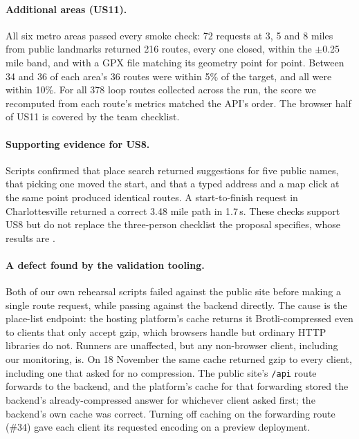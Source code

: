 \paragraph{Additional areas (US11).}
All six metro areas passed every smoke check: 72 requests at 3, 5 and 8 miles
from public landmarks returned 216 routes, every one closed, within the
$\pm$0.25 mile band, and with a GPX file matching its geometry point for
point. Between 34 and 36 of each area's 36 routes were within 5\% of the
target, and all were within 10\%. For all 378 loop routes collected across
the run, the score we recomputed from each route's metrics matched the API's
order. The browser half of US11 is covered by the team checklist.

\paragraph{Supporting evidence for US8.}
Scripts confirmed that place search returned suggestions for five public
names, that picking one moved the start, and that a typed address and a map
click at the same point produced identical routes. A start-to-finish request
in Charlottesville returned a correct 3.48 mile path in 1.7\,s. These checks
support US8 but do not replace the three-person checklist the proposal
specifies, whose results are .

\paragraph{A defect found by the validation tooling.}
Both of our own rehearsal scripts failed against the public site before
making a single route request, while passing against the backend directly.
The cause is the place-list endpoint: the hosting platform's cache returns
it Brotli-compressed even to clients that only accept gzip, which browsers
handle but ordinary HTTP libraries do not. Runners are unaffected, but any
non-browser client, including our monitoring, is. On 18 November the same
cache returned gzip to every client, including one that asked for no
compression. The public site's \texttt{/api} route forwards to the backend,
and the platform's cache for that forwarding stored the backend's
already-compressed answer for whichever client asked first; the backend's own
cache was correct. Turning off caching on the forwarding route (\#34) gave
each client its requested encoding on a preview deployment.

